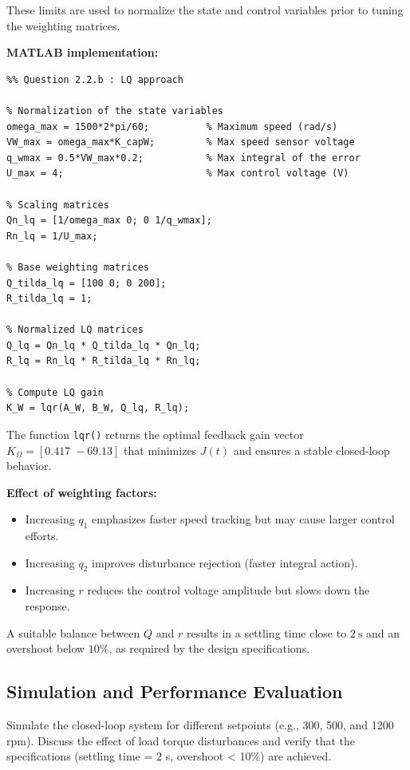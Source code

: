 \documentclass{rapportCS}
\begin{document}
These limits are used to normalize the state and control variables prior to tuning the weighting matrices.

\noindent\textbf{MATLAB implementation:}
\begin{verbatim}
%% Question 2.2.b : LQ approach

% Normalization of the state variables
omega_max = 1500*2*pi/60;          % Maximum speed (rad/s)
VW_max = omega_max*K_capW;         % Max speed sensor voltage
q_wmax = 0.5*VW_max*0.2;           % Max integral of the error
U_max = 4;                         % Max control voltage (V)

% Scaling matrices
Qn_lq = [1/omega_max 0; 0 1/q_wmax]; 
Rn_lq = 1/U_max;

% Base weighting matrices
Q_tilda_lq = [100 0; 0 200];
R_tilda_lq = 1;

% Normalized LQ matrices
Q_lq = Qn_lq * Q_tilda_lq * Qn_lq;
R_lq = Rn_lq * R_tilda_lq * Rn_lq;

% Compute LQ gain
K_W = lqr(A_W, B_W, Q_lq, R_lq);
\end{verbatim}

\noindent The function \texttt{lqr()} returns the optimal feedback gain vector
$K_\Omega = [0.417\; -69.13]$ that minimizes $J(t)$ and ensures
a stable closed-loop behavior.

\noindent\textbf{Effect of weighting factors:}
\begin{itemize}
    \item Increasing $q_1$ emphasizes faster speed tracking but may cause larger control efforts.
    \item Increasing $q_2$ improves disturbance rejection (faster integral action).
    \item Increasing $r$ reduces the control voltage amplitude but slows down the response.
\end{itemize}

A suitable balance between $Q$ and $r$ results in a settling time close to
$2~\mathrm{s}$ and an overshoot below $10\%$, as required by the design specifications.


\subsection{Simulation and Performance Evaluation}
Simulate the closed-loop system for different setpoints (e.g., 300, 500, and 1200 rpm).  
Discuss the effect of load torque disturbances and verify that the specifications (settling time = 2 s, overshoot < 10\%) are achieved.
\end{document}
